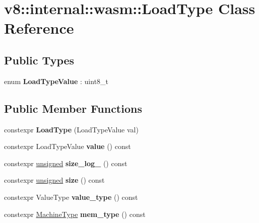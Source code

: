 \hypertarget{classv8_1_1internal_1_1wasm_1_1LoadType}{}\section{v8\+:\+:internal\+:\+:wasm\+:\+:Load\+Type Class Reference}
\label{classv8_1_1internal_1_1wasm_1_1LoadType}
\subsection*{Public Types}
\begin{DoxyCompactItemize}
\item 
\mbox{\label{classv8_1_1internal_1_1wasm_1_1LoadType_a2286c9f8aa3f677cc6da686468fabd20}} 
enum {\bfseries Load\+Type\+Value} \+: uint8\+\_\+t 
\end{DoxyCompactItemize}
\subsection*{Public Member Functions}
\begin{DoxyCompactItemize}
\item 
\mbox{\label{classv8_1_1internal_1_1wasm_1_1LoadType_a045f3e0e833d20e3179708ee13ff2565}} 
constexpr {\bfseries Load\+Type} (Load\+Type\+Value val)
\item 
\mbox{\label{classv8_1_1internal_1_1wasm_1_1LoadType_af691152a452434b8bc205f17c8c181d9}} 
constexpr Load\+Type\+Value {\bfseries value} () const
\item 
\mbox{\label{classv8_1_1internal_1_1wasm_1_1LoadType_ad5bbfd103060b63a2219f8ae6739dc86}} 
constexpr \mbox{\hyperlink{classunsigned}{unsigned}} {\bfseries size\+\_\+log\+\_} () const
\item 
\mbox{\label{classv8_1_1internal_1_1wasm_1_1LoadType_a19e925363ba889a4f0f83956c9f8a8af}} 
constexpr \mbox{\hyperlink{classunsigned}{unsigned}} {\bfseries size} () const
\item 
\mbox{\label{classv8_1_1internal_1_1wasm_1_1LoadType_a02a9b7ef1207875c72251b25d9c9ef58}} 
constexpr Value\+Type {\bfseries value\+\_\+type} () const
\item 
\mbox{\label{classv8_1_1internal_1_1wasm_1_1LoadType_a675d1243f19e9135e866afd3115797f2}} 
constexpr \mbox{\hyperlink{classv8_1_1internal_1_1MachineType}{Machine\+Type}} {\bfseries mem\+\_\+type} () const
\end{DoxyCompactItemize}
